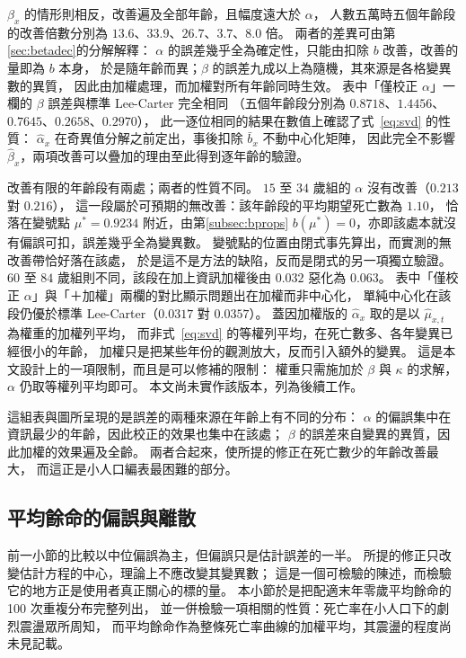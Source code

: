 \documentclass[UTF8, fontset=macnew, a4paper, 12pt]{ctexart}
\begin{document}
$\beta_x$ 的情形則相反，改善遍及全部年齡，且幅度遠大於 $\alpha$，
人數五萬時五個年齡段的改善倍數分別為 $13.6$、$33.9$、$26.7$、$3.7$、$8.0$ 倍。
兩者的差異可由第\ref{sec:betadec}的分解解釋：
$\alpha$ 的誤差幾乎全為確定性，只能由扣除 $b$ 改善，改善的量即為 $b$ 本身，
於是隨年齡而異；$\beta$ 的誤差九成以上為隨機，其來源是各格變異數的異質，
因此由加權處理，而加權對所有年齡同時生效。
表中「僅校正 $\alpha$」一欄的 $\beta$ 誤差與標準 Lee-Carter 完全相同
（五個年齡段分別為 $0.8718$、$1.4456$、$0.7645$、$0.2658$、$0.2970$），
此一逐位相同的結果在數值上確認了式~\eqref{eq:svd} 的性質：
$\hat\alpha_x$ 在奇異值分解之前定出，事後扣除 $\bar b_x$ 不動中心化矩陣，
因此完全不影響 $\hat\beta_x$，兩項改善可以疊加的理由至此得到逐年齡的驗證。

改善有限的年齡段有兩處；兩者的性質不同。
$15$ 至 $34$ 歲組的 $\alpha$ 沒有改善（$0.213$ 對 $0.216$），
這一段屬於可預期的無改善：該年齡段的平均期望死亡數為 $1.10$，
恰落在變號點 $\mu^{\ast}=0.9234$ 附近，由第\ref{subsec:bprops}
$b(\mu^{\ast})=0$，亦即該處本就沒有偏誤可扣，誤差幾乎全為變異數。
變號點的位置由閉式事先算出，而實測的無改善帶恰好落在該處，
於是這不是方法的缺陷，反而是閉式的另一項獨立驗證。
$60$ 至 $84$ 歲組則不同，該段在加上資訊加權後由 $0.032$ 惡化為 $0.063$。
表中「僅校正 $\alpha$」與「＋加權」兩欄的對比顯示問題出在加權而非中心化，
單純中心化在該段仍優於標準 Lee-Carter（$0.0317$ 對 $0.0357$）。
蓋因加權版的 $\hat\alpha_x$ 取的是以 $\hat\mu_{x,t}$ 為權重的加權列平均，
而非式~\eqref{eq:svd} 的等權列平均，在死亡數多、各年變異已經很小的年齡，
加權只是把某些年份的觀測放大，反而引入額外的變異。
這是本文設計上的一項限制，而且是可以修補的限制：
權重只需施加於 $\beta$ 與 $\kappa$ 的求解，$\alpha$ 仍取等權列平均即可。
本文尚未實作該版本，列為後續工作。

這組表與圖所呈現的是誤差的兩種來源在年齡上有不同的分布：
$\alpha$ 的偏誤集中在資訊最少的年齡，因此校正的效果也集中在該處；
$\beta$ 的誤差來自變異的異質，因此加權的效果遍及全齡。
兩者合起來，使所提的修正在死亡數少的年齡改善最大，
而這正是小人口編表最困難的部分。

\subsection{平均餘命的偏誤與離散}\label{sec:e0var}

前一小節的比較以中位偏誤為主，但偏誤只是估計誤差的一半。
所提的修正只改變估計方程的中心，理論上不應改變其變異數；
這是一個可檢驗的陳述，而檢驗它的地方正是使用者真正關心的標的量。
本小節於是把配適末年零歲平均餘命的 100 次重複分布完整列出，
並一併檢驗一項相關的性質：死亡率在小人口下的劇烈震盪眾所周知，
而平均餘命作為整條死亡率曲線的加權平均，其震盪的程度尚未見記載。
\end{document}

